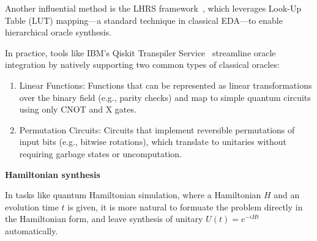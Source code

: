 \documentclass[a4paper,onecolumn,11pt,unpublished]{quantumarticle}
\begin{document}
Another influential method is the LHRS framework~\cite{soekenLUTBasedHierarchicalReversible2019}, which leverages Look-Up Table (LUT) mapping---a standard technique in classical EDA---to enable hierarchical oracle synthesis. 

In practice, tools like IBM's Qiskit Transpiler Service~\cite{kremerPracticalEfficientQuantum2024} streamline oracle integration by natively supporting two common types of classical oracles:  
\begin{enumerate}
\item Linear Functions: Functions that can be represented as linear transformations over the binary field (e.g., parity checks) and map to simple quantum circuits using only CNOT and X gates.  
\item Permutation Circuits: Circuits that implement reversible permutations of input bits (e.g., bitwise rotations), which translate to unitaries without requiring garbage states or uncomputation.
\end{enumerate}

\iffalse

\textbf{Hamiltonian synthesis}

In tasks like quantum Hamiltonian simulation\cite{lloydUniversalQuantumSimulators1996}, where a Hamiltonian $H$ and an evolution time $t$ is given, it is more natural to formuate the problem directly in the Hamiltonian form, and leave synthesis of unitary $U(t)=e^{-iHt}$ automatically.
\end{document}
